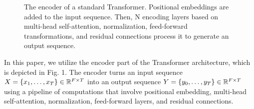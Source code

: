 \documentclass[lettersize,journal]{IEEEtran}
\begin{document}
\begin{figure}[t!]
\begin{center}
{
    }
    \end{center}
     


\caption{The encoder of a standard Transformer. Positional embeddings are added to the input sequence. Then, N encoding layers based on multi-head self-attention, normalization, feed-forward transformations, and residual connections process it to generate an output sequence.}
\end{figure}

In this paper, we utilize the encoder part of the Transformer architecture, which is depicted in Fig. 1. The encoder turns an input sequence $X=\{x_1,\dots,x_{T}\} \in \mathbb R^{F \times T}$  into an output sequence $Y=\{y_0,\dots,y_{T}\} \in \mathbb R^{F \times T}$ using a pipeline of computations that involve positional embedding, multi-head self-attention, normalization, feed-forward layers, and residual connections.
\end{document}
